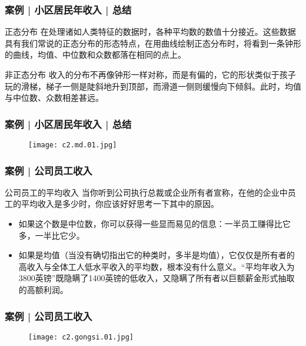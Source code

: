 \begin{frame}
  \frametitle{案例 | 小区居民年收入 | 总结}
  \begin{block}{正态分布}
在处理诸如人类特征的数据时，各种平均数的数值十分接近。这些数据具有我们常说的正态分布的形态特点，在用曲线绘制正态分布时，将看到一条钟形的曲线，均值、中位数和众数都落在相同的点上。
  \end{block}
  \pause
  \begin{block}{非正态分布}
收入的分布不再像钟形一样对称，而是有偏的，它的形状类似于孩子玩的滑梯，梯子一侧是陡斜地升到顶部，而滑道一侧则缓慢向下倾斜。此时，均值与中位数、众数相差甚远。
  \end{block}
  \vspace{-0.5em}
  \begin{figure}
    \centering
    \quad
  \end{figure}
\end{frame}

\begin{frame}
  \frametitle{案例 | 小区居民年收入 | 总结}
  \begin{figure}
    \centering
    \texttt{[image: c2.md.01.jpg]}
  \end{figure}
\end{frame}

\begin{frame}
  \frametitle{案例 | 公司员工收入}
  \begin{block}{公司员工的平均收入}
    当你听到公司执行总裁或企业所有者宣称，在他的企业中员工的平均收入是多少时，你应该好好思考一下其中的原因。
    \begin{itemize}
      \item 如果这个数是中位数，你可以获得一些显而易见的信息：一半员工赚得比它多，一半比它少。
      \item 如果是均值（当没有确切指出它的种类时，多半是均值），它仅仅是所有者的高收入与全体工人低水平收入的平均数，根本没有什么意义。“平均年收入为3800英镑”既隐瞒了1400英镑的低收入，又隐瞒了所有者以巨额薪金形式抽取的高额利润。
    \end{itemize}
  \end{block}
\end{frame}

\begin{frame}
  \frametitle{案例 | 公司员工收入}
  \begin{figure}
    \centering
    \texttt{[image: c2.gongsi.01.jpg]}
  \end{figure}
\end{frame}

